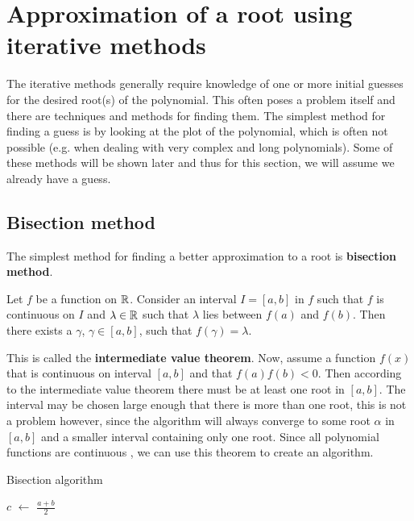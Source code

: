 \documentclass[
  digital, %
  table,   %
  nolof,     %
  nolot,     %
	draft, %
]{fithesis3}
\begin{document}
\section{Approximation of a root using iterative methods}
The iterative methods generally require knowledge of one or more initial guesses for the desired root(s) of the polynomial. This often poses a problem itself and there are techniques and methods for finding them. The simplest method for finding a guess is by looking at the plot of the polynomial, which is often not possible (e.g. when dealing with very complex and long polynomials). Some of these methods will be shown later and thus for this section, we will assume we already have a guess.

\subsection{Bisection method}
The simplest method for finding a better approximation to a root is \textbf{bisection method}. 
\begin{theorem}
Let $f$ be a function on $\mathbb{R}$. Consider an interval $I=[a,b]$ in $f$ such that $f$ is continuous on $I$ and $\lambda\in\mathbb{R}$ such that $\lambda$ lies between $f(a)$ and $f(b)$. Then there exists a $\gamma$, $\gamma\in[a,b]$, such that $f(\gamma)=\lambda$.
\end{theorem}
This is called the \textbf{intermediate value theorem}\parencite{interValue}. Now, assume a function $f(x)$ that is continuous on interval $[a,b]$ and that $f(a)f(b)<0$. Then according to the intermediate value theorem there must be at least one root in $[a,b]$. The interval may be chosen large enough that there is more than one root, this is not a problem however, since the algorithm will always converge to some root $\alpha$ in $[a,b]$ and a smaller interval containing only one root. Since all polynomial functions are continuous \parencite{polyCont}, we can use this theorem to create an algorithm.
\newcommand*\Let[2]{\State #1 $\gets$ #2}
\algrenewcommand{}
\algrenewcommand{}
\begin{algorithm}
  \caption{Bisection algorithm
    \label{alg:bisect}}
  \begin{algorithmic}[1]
    \Statex
      \Let{$c$}{$\frac{a + b}{2}$}
				\State{}
			\EndIf
				\State {}
				\Else \State {}
			\EndIf
    \EndFunction
  \end{algorithmic}
\end{algorithm}
\end{document}
